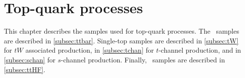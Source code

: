 
\chapter{Top-quark processes}

This chapter describes the samples used for top-quark processes.
The \ttbar\ samples are described in \cref{subsec:ttbar}.
Single-top samples are described in \cref{subsec:tW} for $tW$ associated production,
in \cref{subsec:tchan} for $t$-channel production,
and in \cref{subsec:schan} for $s$-channel production.
Finally, \ttHF\ samples are described in \cref{subsec:ttHF}.





